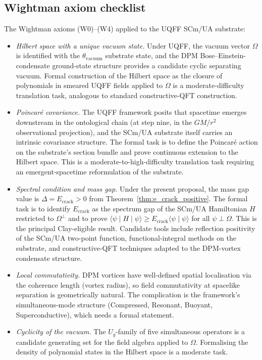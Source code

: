 \documentclass[11pt,a4paper,onecolumn]{article}
\theoremstyle{plain}
\theoremstyle{definition}
\theoremstyle{remark}
\begin{document}
\subsection{Wightman axiom checklist}
The Wightman axioms (W0)--(W4) applied to the UQFF SCm/UA substrate:
\begin{itemize}
\item[\textbf{W0}] \textit{Hilbert space with a unique vacuum state.}
  Under UQFF, the vacuum vector $\Omega$ is identified with the
  $\theta_{\text{vacuum}}$ substrate state, and the DPM
  Bose--Einstein-condensate ground-state structure provides a
  candidate cyclic separating vacuum. Formal construction of the
  Hilbert space as the closure of polynomials in smeared UQFF fields
  applied to $\Omega$ is a moderate-difficulty translation task,
  analogous to standard constructive-QFT construction.
\item[\textbf{W1}] \textit{Poincar\'e covariance.} The UQFF framework
  posits that spacetime emerges downstream in the ontological chain
  (at step nine, in the $GM/r^2$ observational projection), and the
  SCm/UA substrate itself carries an intrinsic covariance structure.
  The formal task is to define the Poincar\'e action on the
  substrate's section bundle and prove continuous extension to the
  Hilbert space. This is a moderate-to-high-difficulty translation
  task requiring an emergent-spacetime reformulation of the substrate.
\item[\textbf{W2}] \textit{Spectral condition and mass gap.} Under the
  present proposal, the mass gap value is
  $\Delta = E_{\text{crack}} > 0$ from
  Theorem~\ref{thm:e_crack_positive}. The formal task is to identify
  $E_{\text{crack}}$ as the spectrum gap of the SCm/UA Hamiltonian
  $H$ restricted to $\Omega^\perp$ and to prove
  $\langle \psi \mid H \mid \psi \rangle \geq E_{\text{crack}}
   \langle \psi \mid \psi \rangle$ for all $\psi \perp \Omega$.
  This is the principal Clay-eligible result. Candidate tools
  include reflection positivity of the SCm/UA two-point function,
  functional-integral methods on the substrate, and constructive-QFT
  techniques adapted to the DPM-vortex condensate structure.
\item[\textbf{W3}] \textit{Local commutativity.} DPM vortices have
  well-defined spatial localisation via the coherence length
  (vortex radius), so field commutativity at spacelike separation
  is geometrically natural. The complication is the framework's
  simultaneous-mode structure (Compressed, Resonant, Buoyant,
  Superconductive), which needs a formal statement.
\item[\textbf{W4}] \textit{Cyclicity of the vacuum.} The $U_g$-family
  of five simultaneous operators is a candidate generating set for
  the field algebra applied to $\Omega$. Formalising the density of
  polynomial states in the Hilbert space is a moderate task.
\end{itemize}
\end{document}
